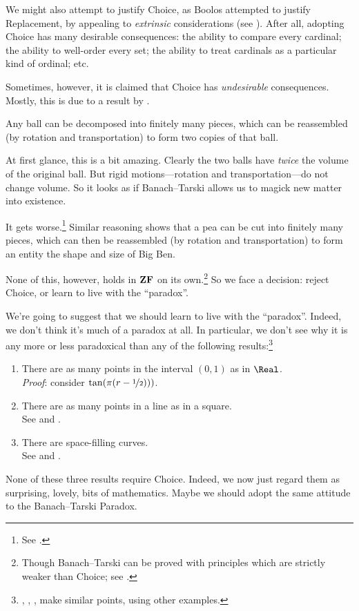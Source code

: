 \documentclass[../../../include/open-logic-section]{subfiles}
\begin{document}

We might also attempt to justify Choice, as Boolos attempted to
justify Replacement, by appealing to \emph{extrinsic} considerations
(see ). After all, adopting Choice
has many desirable consequences: the ability to compare every
cardinal; the ability to well-order every set; the ability to treat
cardinals as a particular kind of ordinal; etc. 

Sometimes, however, it is claimed that Choice has \emph{undesirable}
consequences. Mostly, this is due to a result by
\cite{BanachTarski1924}. 

\begin{thm}
Any ball can be decomposed into finitely many pieces, which can be
reassembled (by rotation and transportation) to form two copies of
that ball.
\end{thm}
\noindent 
At first glance, this is a bit amazing. Clearly the two balls have
\emph{twice} the volume of the original ball. But rigid
motions---rotation and transportation---do not change volume. So it
looks as if Banach--Tarski allows us to magick new matter into
existence.

It gets worse.\footnote{See \citet[Theorem 3.12]{Wagon2016}.} Similar
reasoning shows that a pea can be cut into finitely many pieces, which
can then be reassembled (by rotation and transportation) to form an
entity the shape and size of Big Ben.

None of this, however, holds in $\mathbf{ZF}$ on its own.\footnote{Though
Banach--Tarski can be proved with principles which are strictly weaker
than Choice; see \citet[303]{Wagon2016}.} So we face a decision:
reject Choice, or learn to live with the ``paradox''. 

We're going to suggest that we should learn to live with the
``paradox''. Indeed, we don't think it's much of a paradox at all. In
particular, we don't see why it is any more or less paradoxical than
any of the following results:\footnote{\citet[276--7]{Potter2004},
\citet[16]{Weston2003}, \citet[31, 308--9]{Wagon2016}, make
similar points, using other examples.}
\begin{enumerate}
	\item There are as many points in the interval $(0,1)$ as in  $\Real$. 
	\\\emph{Proof}: consider $\tan(\pi(r-\nicefrac{1}{2})))$.
	\item There are as many points in a line as in a square.
	\\See {} and .
	\item There are space-filling curves. 
	\\See {} and .
\end{enumerate}
None of these three results require Choice. Indeed, we now just regard
them as surprising, lovely, bits of mathematics. Maybe we should adopt
the same attitude to the Banach--Tarski Paradox.
\end{document}
